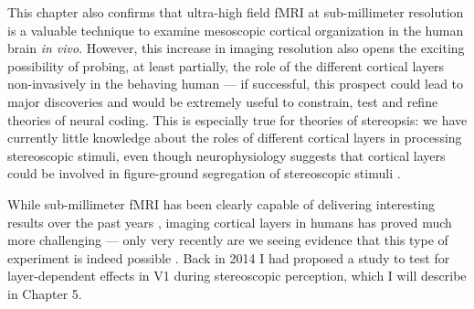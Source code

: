 This chapter also confirms that ultra-high field fMRI at sub-millimeter resolution is a valuable technique to examine mesoscopic cortical organization in the human brain {\it in vivo}. However, this increase in imaging resolution also opens the exciting possibility of probing, at least partially, the role of the different cortical layers non-invasively in the behaving human --- if successful, this prospect could lead to major discoveries and would be extremely useful to constrain, test and refine theories of neural coding. This is especially true for theories of stereopsis: we have currently little knowledge about the roles of different cortical layers in processing stereoscopic stimuli, even though neurophysiology suggests that cortical layers could be involved in figure-ground segregation of stereoscopic stimuli \cite{Zipser:1996wv,Self:2013qe}.

While sub-millimeter fMRI has been clearly capable of delivering interesting results over the past years \cite{Cheng:2001fk,Yacoub:2008hr,Zimmermann:2011kl,Harvey:2013jo,Goncalves:2015aa,Nasr:2016kx,Nasr:2016ys}, imaging cortical layers in humans has proved much more challenging --- only very recently are we seeing evidence that this type of experiment is indeed possible \cite{Kok:2016fk}. Back in 2014 I had proposed a study to test for layer-dependent effects in V1 during stereoscopic perception, which I will describe in Chapter 5.


